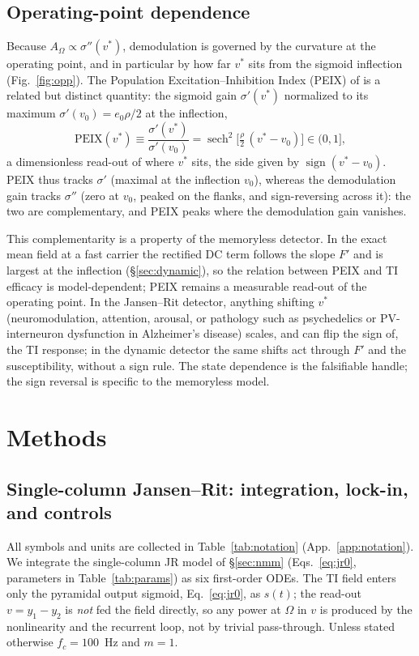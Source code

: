 \documentclass[11pt,a4paper]{article}
\newcommand{\Sig}{\sigma}
\begin{document}
\subsection{Operating-point dependence}\label{sec:opp}
Because $A_\Omega\propto\Sig''(v^*)$, demodulation is governed by the curvature at
the operating point, and in particular by how far $v^*$ sits from the sigmoid
inflection (Fig.~\ref{fig:opp}). The Population Excitation--Inhibition Index (PEIX)
of \cite{ruffini2025cfc} is a related but distinct quantity: the sigmoid gain
$\Sig'(v^*)$ normalized to its maximum $\Sig'(v_0)=e_0 \rho/2$ at the inflection,
\begin{equation}
\mathrm{PEIX}(v^*)\equiv\frac{\Sig'(v^*)}{\Sig'(v_0)}
=\operatorname{sech}^2\!\Big[\tfrac{\rho}{2}\,(v^*-v_0)\Big]\in(0,1],
\label{eq:peix}
\end{equation}
a dimensionless read-out of where $v^*$ sits, the side given by
$\operatorname{sign}(v^*-v_0)$. PEIX thus tracks $\Sig'$ (maximal at the inflection
$v_0$), whereas the demodulation gain tracks $\Sig''$ (zero at $v_0$, peaked on the
flanks, and sign-reversing across it): the two are complementary, and PEIX peaks
where the demodulation gain vanishes.

This complementarity is a property of the memoryless detector. In the exact mean field at a fast carrier the rectified DC term
follows the slope $F'$ and is largest at the inflection (\S\ref{sec:dynamic}), so the
relation between PEIX and TI efficacy is model-dependent; PEIX remains a measurable
read-out of the operating point. In the Jansen--Rit detector, anything shifting $v^*$
(neuromodulation, attention, arousal, or pathology such as psychedelics or PV-interneuron
dysfunction in Alzheimer's disease) scales, and can flip the sign of, the TI response; in
the dynamic detector the same shifts act through $F'$ and the susceptibility, without a
sign rule. The state dependence is the falsifiable handle; the sign reversal is specific
to the memoryless model.


\section{Methods}

\subsection{Single-column Jansen--Rit: integration, lock-in, and controls}
All symbols and units are collected in Table~\ref{tab:notation}
(App.~\ref{app:notation}). We integrate the single-column JR model of \S\ref{sec:nmm}
(Eqs.~\eqref{eq:jr0}, parameters in Table~\ref{tab:params}) as six first-order
ODEs. The TI field enters only the pyramidal output sigmoid, Eq.~\eqref{eq:jr0},
as $s(t)$; the read-out $v=y_1-y_2$ is \emph{not} fed the field directly, so any
power at $\Omega$ in $v$ is produced by the nonlinearity and the recurrent loop,
not by trivial pass-through. Unless stated otherwise $f_c=100$~Hz and $m=1$.
\end{document}
